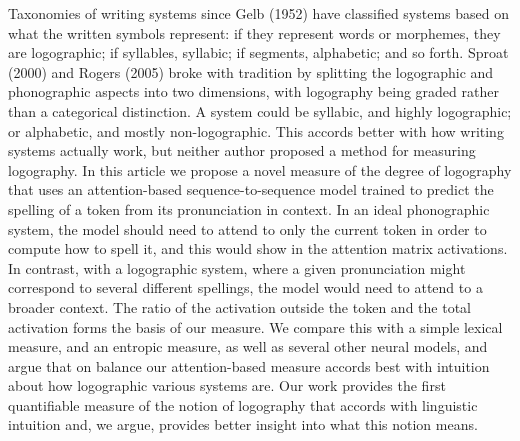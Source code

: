 Taxonomies of writing systems since Gelb (1952) have classified systems based on what the written symbols represent: if they represent words or morphemes, they are logographic; if syllables, syllabic; if segments, alphabetic; and so forth. Sproat (2000) and Rogers (2005) broke with tradition by splitting the logographic and phonographic aspects into two dimensions, with logography being graded rather than a categorical distinction. A system could be syllabic, and highly logographic; or alphabetic, and mostly non-logographic. This accords better with how writing systems actually work, but neither author proposed a method for measuring logography. In this article we propose a novel measure of the degree of logography that uses an attention-based sequence-to-sequence model trained to predict the spelling of a token from its pronunciation in context. In an ideal phonographic system, the model should need to attend to only the current token in order to compute how to spell it, and this would show in the attention matrix activations. In contrast, with a logographic system, where a given pronunciation might correspond to several different spellings, the model would need to attend to a broader context. The ratio of the activation outside the token and the total activation forms the basis of our measure. We compare this with a simple lexical measure, and an entropic measure, as well as several other neural models, and argue that on balance our attention-based measure accords best with intuition about how logographic various systems are. Our work provides the first quantifiable measure of the notion of logography that accords with linguistic intuition and, we argue, provides better insight into what this notion means.
